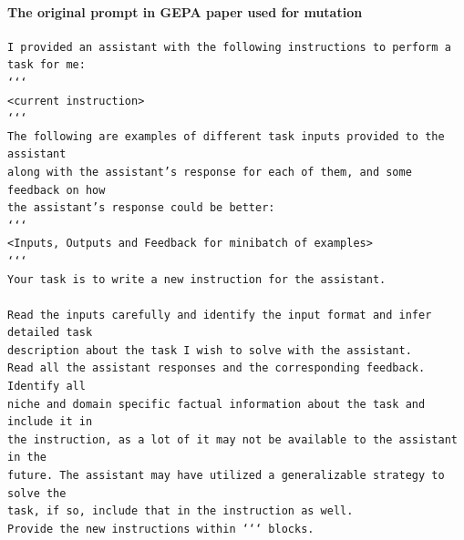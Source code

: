 \documentclass[12pt]{article}
\begin{document}
\paragraph{The original prompt in GEPA paper used for mutation}
\begin{verbatim}
I provided an assistant with the following instructions to perform a task for me:
‘‘‘
<current instruction>
‘‘‘
The following are examples of different task inputs provided to the assistant
along with the assistant’s response for each of them, and some feedback on how
the assistant’s response could be better:
‘‘‘
<Inputs, Outputs and Feedback for minibatch of examples>
‘‘‘
Your task is to write a new instruction for the assistant.

Read the inputs carefully and identify the input format and infer detailed task
description about the task I wish to solve with the assistant.
Read all the assistant responses and the corresponding feedback. Identify all
niche and domain specific factual information about the task and include it in
the instruction, as a lot of it may not be available to the assistant in the
future. The assistant may have utilized a generalizable strategy to solve the
task, if so, include that in the instruction as well.
Provide the new instructions within ‘‘‘ blocks.
\end{verbatim}
\end{document}
